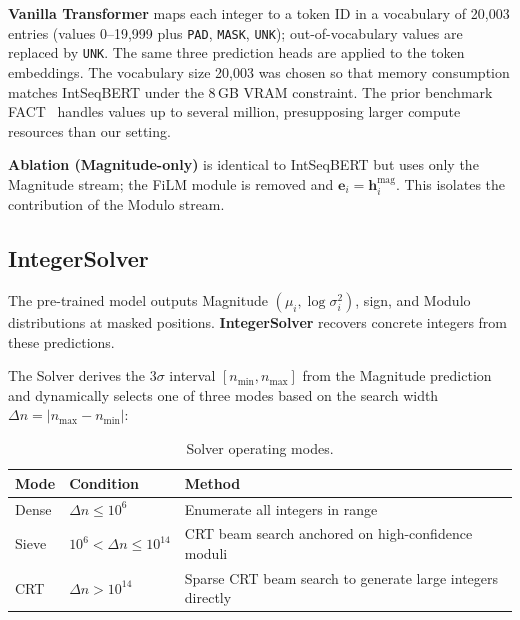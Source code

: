 \textbf{Vanilla Transformer} maps each integer to a token ID in a vocabulary of 20,003 entries
(values 0--19{,}999 plus \texttt{PAD}, \texttt{MASK}, \texttt{UNK}); out-of-vocabulary values
are replaced by \texttt{UNK}. The same three prediction heads are applied to the token
embeddings. The vocabulary size 20,003 was chosen so that memory consumption matches
IntSeqBERT under the 8\,GB VRAM constraint. The prior benchmark FACT~\cite{zurich-fact}
handles values up to several million, presupposing larger compute resources than our setting.

\textbf{Ablation (Magnitude-only)} is identical to IntSeqBERT but uses only the Magnitude
stream; the FiLM module is removed and $\mathbf{e}_i = \mathbf{h}_i^{\text{mag}}$. This
isolates the contribution of the Modulo stream.

\subsection{IntegerSolver}
\label{sec:solver}

The pre-trained model outputs Magnitude $(\mu_i, \log \sigma_i^2)$, sign, and Modulo
distributions at masked positions. \textbf{IntegerSolver} recovers concrete integers from these
predictions.

The Solver derives the $3\sigma$ interval $[n_{\min}, n_{\max}]$ from the Magnitude prediction
and dynamically selects one of three modes based on the search width
$\Delta n = |n_{\max} - n_{\min}|$:

\begin{table}[t]
\caption{Solver operating modes.}
\label{tab:solver}
\centering
\begin{tabular}{llp{5.5cm}}
\hline
Mode     & Condition                              & Method \\
\hline
Dense    & $\Delta n \leq 10^6$                   & Enumerate all integers in range \\
Sieve    & $10^6 < \Delta n \leq 10^{14}$         & CRT beam search anchored on high-confidence moduli \\
CRT      & $\Delta n > 10^{14}$                   & Sparse CRT beam search to generate large integers directly \\
\hline
\end{tabular}
\end{table}

